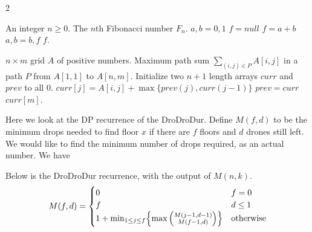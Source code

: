 \begin{paracol}{2}
\begin{algorithm}
        \caption{Saving Memory with Fibonacci}
        \label{Fibonacci}
    \begin{algorithmic}[1]
    \Require An integer $n \geq 0$. 
    \Ensure The $n$th Fibonacci number $F_n$. 
    \State $a,b = 0,1$
    \State $f = null$
        \State $f = a + b$
        \State $a, b = b, f$
    \EndFor
    \State \Return $f$. 
    \end{algorithmic}
\end{algorithm}
\bigskip
\begin{algorithm}
\caption{Saving Space with Max GPS}
    \begin{algorithmic}[1]
        \Require $n \times m$ grid $A$ of positive numbers. 
        \Ensure Maximum path sum $\sum_{(i, j) \in P}A[i, j]$ in a path $P$ from $A[1, 1]$ to $A[n, m]$. 
        \State Initialize two $n + 1$ length arrays $curr$ and $prev$ to all $0$. 
                \State $curr[j] = A[i, j] + \max\{prev(j), curr(j - 1)\}$
            \EndFor
            \State $prev = curr$
        \EndFor
        \State \Return $curr[m]$. 
    \end{algorithmic}
\end{algorithm}
\switchcolumn

Here we look at the DP recurrence of the DroDroDur. Define $M(f, d)$ to be the minimum drops needed to find floor $x$ if there are $f$ floors and $d$ drones still left. We would like to find the minimum number of drops required, as an actual number. We have 

\switchcolumn
\bigskip
Below is the DroDroDur recurrence, with the output of $M(n, k)$. 
$$
M(f, d) =
\begin{cases}
    0 & f = 0 \\
    f & d \leq 1 \\
    1 + \min_{1 \leq j \leq f} \Bigl\{\max{\left(\substack{M(j - 1, d - 1) \\ M(f - 1, d)}\right)}\Bigl\} & \textrm{otherwise}
\end{cases}
$$
\switchcolumn
\end{paracol}


\newpage
